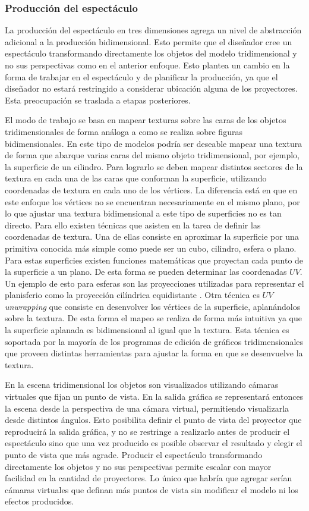 \subsubsection{Producción del espectáculo}
La producción del espectáculo en tres dimensiones agrega un nivel de abstracción adicional a la producción bidimensional. Esto permite que el diseñador cree un espectáculo transformando directamente los objetos del modelo tridimensional y no sus perspectivas como en el anterior enfoque.
Esto plantea un cambio en la forma de trabajar en el espectáculo y de planificar la producción, ya que el diseñador no estará restringido a considerar ubicación alguna de los proyectores. Esta preocupación se traslada a etapas posteriores.

El modo de trabajo se basa en mapear texturas sobre las caras de los objetos tridimensionales de forma análoga a como se realiza sobre figuras bidimensionales. En este tipo de modelos podría ser deseable mapear una textura de forma que abarque varias caras del mismo objeto tridimensional, por ejemplo, la superficie de un cilindro. Para lograrlo se deben mapear distintos sectores de la textura en cada una de las caras que conforman la superficie, utilizando coordenadas de textura en cada uno de los vértices. La diferencia está en que en este enfoque los vértices no se encuentran necesariamente en el mismo plano, por lo que ajustar una textura bidimensional a este tipo de superficies no es tan directo. Para ello existen técnicas que asisten en la tarea de definir las coordenadas de textura. Una de ellas consiste en aproximar la superficie por una primitiva conocida más simple como puede ser un cubo, cilindro, esfera o plano. Para estas superficies existen funciones matemáticas que proyectan cada punto de la superficie a un plano. De esta forma se pueden determinar las coordenadas $UV$. Un ejemplo de esto para esferas son las proyecciones utilizadas para representar el planisferio como la proyección cilíndrica equidistante \cite{flatteningTheEarth}. Otra técnica es $UV$ \emph{unwrapping} que consiste en desenvolver los vértices de la superficie, aplanándolos sobre la textura. De esta forma el mapeo se realiza de forma más intuitiva ya que la superficie aplanada es bidimensional al igual que la textura. Esta técnica es soportada por la mayoría de los programas de edición de gráficos tridimensionales que proveen distintas herramientas para ajustar la forma en que se desenvuelve la textura.

En la escena tridimensional los objetos son visualizados utilizando cámaras virtuales que fijan un punto de vista. En la salida gráfica se representará entonces la escena desde la perspectiva de una cámara virtual, permitiendo visualizarla desde distintos ángulos. Esto posibilita definir el punto de vista del proyector que reproducirá la salida gráfica, y no se restringe a realizarlo antes de producir el espectáculo sino que una vez producido es posible observar el resultado y elegir el punto de vista que más agrade.
Producir el espectáculo transformando directamente los objetos y no sus perspectivas permite escalar con mayor facilidad en la cantidad de proyectores. Lo único que habría que agregar serían cámaras virtuales que definan más puntos de vista sin modificar el modelo ni los efectos producidos.

